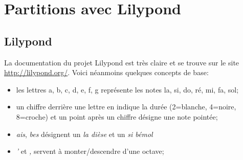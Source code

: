 \documentclass[versionenligne]{framabook}
\begin{document}
%
%
%
%
%


\section{Partitions avec Lilypond}

\subsection{Lilypond}

La documentation du projet Lilypond est très
claire et se trouve sur le site \url{http://lilypond.org/}.
Voici néanmoins quelques concepts de base:

\begin{itemize}
\item les lettres a, b, c, d, e, f, g représente les notes la, si, do,
  ré, mi, fa, sol;
\item un chiffre derrière une lettre en indique la durée (2=blanche, 4=noire,
  8=croche) et un point après un chiffre désigne une note pointée;
\item \emph{ais}, \emph{bes} désignent un \emph{la dièse} et un \emph{si bémol}
\item \emph{'} et \emph{,} servent à monter/descendre d'une octave;
\end{itemize}
\end{document}
